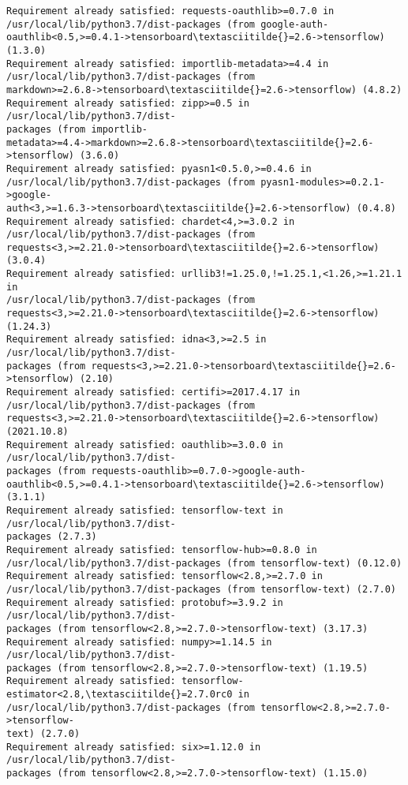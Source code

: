 \documentclass[11pt]{article}
\begin{document}
\begin{Verbatim}[commandchars=\\\{\}]
Requirement already satisfied: requests-oauthlib>=0.7.0 in
/usr/local/lib/python3.7/dist-packages (from google-auth-
oauthlib<0.5,>=0.4.1->tensorboard\textasciitilde{}=2.6->tensorflow) (1.3.0)
Requirement already satisfied: importlib-metadata>=4.4 in
/usr/local/lib/python3.7/dist-packages (from
markdown>=2.6.8->tensorboard\textasciitilde{}=2.6->tensorflow) (4.8.2)
Requirement already satisfied: zipp>=0.5 in /usr/local/lib/python3.7/dist-
packages (from importlib-
metadata>=4.4->markdown>=2.6.8->tensorboard\textasciitilde{}=2.6->tensorflow) (3.6.0)
Requirement already satisfied: pyasn1<0.5.0,>=0.4.6 in
/usr/local/lib/python3.7/dist-packages (from pyasn1-modules>=0.2.1->google-
auth<3,>=1.6.3->tensorboard\textasciitilde{}=2.6->tensorflow) (0.4.8)
Requirement already satisfied: chardet<4,>=3.0.2 in
/usr/local/lib/python3.7/dist-packages (from
requests<3,>=2.21.0->tensorboard\textasciitilde{}=2.6->tensorflow) (3.0.4)
Requirement already satisfied: urllib3!=1.25.0,!=1.25.1,<1.26,>=1.21.1 in
/usr/local/lib/python3.7/dist-packages (from
requests<3,>=2.21.0->tensorboard\textasciitilde{}=2.6->tensorflow) (1.24.3)
Requirement already satisfied: idna<3,>=2.5 in /usr/local/lib/python3.7/dist-
packages (from requests<3,>=2.21.0->tensorboard\textasciitilde{}=2.6->tensorflow) (2.10)
Requirement already satisfied: certifi>=2017.4.17 in
/usr/local/lib/python3.7/dist-packages (from
requests<3,>=2.21.0->tensorboard\textasciitilde{}=2.6->tensorflow) (2021.10.8)
Requirement already satisfied: oauthlib>=3.0.0 in /usr/local/lib/python3.7/dist-
packages (from requests-oauthlib>=0.7.0->google-auth-
oauthlib<0.5,>=0.4.1->tensorboard\textasciitilde{}=2.6->tensorflow) (3.1.1)
Requirement already satisfied: tensorflow-text in /usr/local/lib/python3.7/dist-
packages (2.7.3)
Requirement already satisfied: tensorflow-hub>=0.8.0 in
/usr/local/lib/python3.7/dist-packages (from tensorflow-text) (0.12.0)
Requirement already satisfied: tensorflow<2.8,>=2.7.0 in
/usr/local/lib/python3.7/dist-packages (from tensorflow-text) (2.7.0)
Requirement already satisfied: protobuf>=3.9.2 in /usr/local/lib/python3.7/dist-
packages (from tensorflow<2.8,>=2.7.0->tensorflow-text) (3.17.3)
Requirement already satisfied: numpy>=1.14.5 in /usr/local/lib/python3.7/dist-
packages (from tensorflow<2.8,>=2.7.0->tensorflow-text) (1.19.5)
Requirement already satisfied: tensorflow-estimator<2.8,\textasciitilde{}=2.7.0rc0 in
/usr/local/lib/python3.7/dist-packages (from tensorflow<2.8,>=2.7.0->tensorflow-
text) (2.7.0)
Requirement already satisfied: six>=1.12.0 in /usr/local/lib/python3.7/dist-
packages (from tensorflow<2.8,>=2.7.0->tensorflow-text) (1.15.0)

\end{Verbatim}
\end{document}
